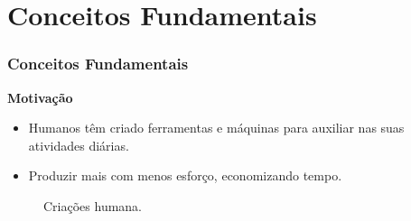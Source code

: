 \section{Conceitos Fundamentais}
\begin{frame}
	\frametitle{Conceitos Fundamentais}
	\textbf{Motivação}
	\begin{itemize}
		\item Humanos têm criado ferramentas e máquinas para auxiliar nas suas atividades diárias.
		\item Produzir mais com menos esforço, economizando tempo.
	\end{itemize}


	\begin{figure}
		\centering
		\hfill
		\hfill
		\hfill
		\caption{Criações humana.}
		\label{fig:figures}
	\end{figure}
\end{frame}




